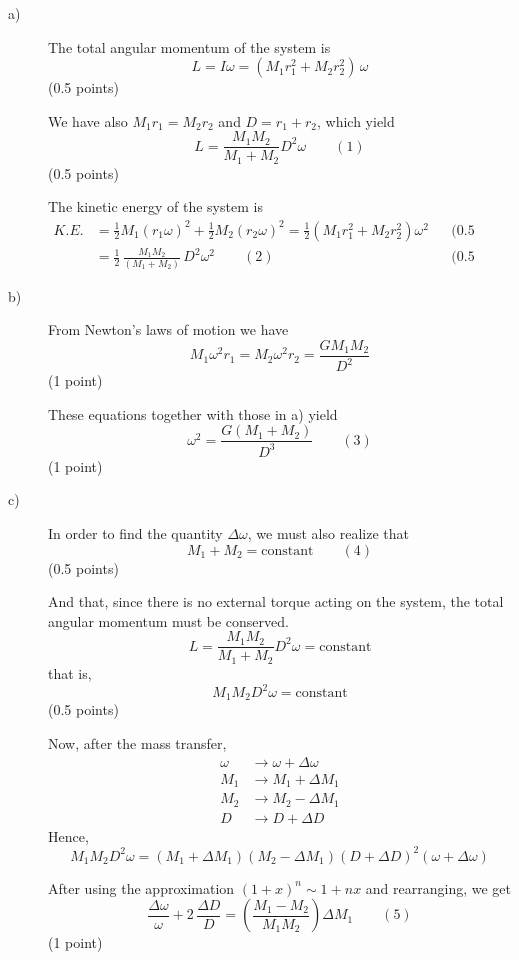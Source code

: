 \begin{description}
\item[a)] The total angular momentum of the system is
\[ L = I\omega = (M_1 r_1^2 + M_2 r_2^2)\,\omega \]
\hfill(0.5 points)

We have also $M_1 r_1 = M_2 r_2$ and $D = r_1 + r_2$, which yield
\[ L = \frac{M_1 M_2}{M_1 + M_2} D^2 \omega \qquad (1) \]
\hfill(0.5 points)

The kinetic energy of the system is
\begin{align*}
K.E. &= \frac{1}{2} M_1 (r_1\omega)^2 + \frac{1}{2} M_2 (r_2\omega)^2
  = \frac{1}{2}\left(M_1 r_1^2 + M_2 r_2^2\right)\omega^2
  && \text{(0.5 points)} \\
&= \frac{1}{2}\,\frac{M_1 M_2}{(M_1 + M_2)}\, D^2\omega^2
  \qquad (2)
  && \text{(0.5 points)}
\end{align*}

\item[b)] From Newton's laws of motion we have
\[ M_1\omega^2 r_1 = M_2\omega^2 r_2 = \frac{G M_1 M_2}{D^2} \]
\hfill(1 point)

These equations together with those in a) yield
\[ \omega^2 = \frac{G(M_1 + M_2)}{D^3} \qquad (3) \]
\hfill(1 point)

\item[c)] In order to find the quantity $\Delta\omega$, we must also realize
that
\[ M_1 + M_2 = \text{constant} \qquad (4) \]
\hfill(0.5 points)

And that, since there is no external torque acting on the system, the total
angular momentum must be conserved.
\[ L = \frac{M_1 M_2}{M_1 + M_2} D^2\omega = \text{constant} \]
that is,
\[ M_1 M_2 D^2 \omega = \text{constant} \]
\hfill(0.5 points)

Now, after the mass transfer,
\begin{align*}
\omega &\to \omega + \Delta\omega \\
M_1 &\to M_1 + \Delta M_1 \\
M_2 &\to M_2 - \Delta M_1 \\
D &\to D + \Delta D
\end{align*}
Hence,
\[ M_1 M_2 D^2\omega
   = \left(M_1 + \Delta M_1\right)\left(M_2 - \Delta M_1\right)
     \left(D + \Delta D\right)^2\left(\omega + \Delta\omega\right) \]

After using the approximation $(1+x)^n \sim 1 + nx$ and rearranging, we get
\[ \frac{\Delta\omega}{\omega} + 2\,\frac{\Delta D}{D}
   = \left(\frac{M_1 - M_2}{M_1 M_2}\right)\Delta M_1 \qquad (5) \]
\hfill(1 point)


\end{description}
